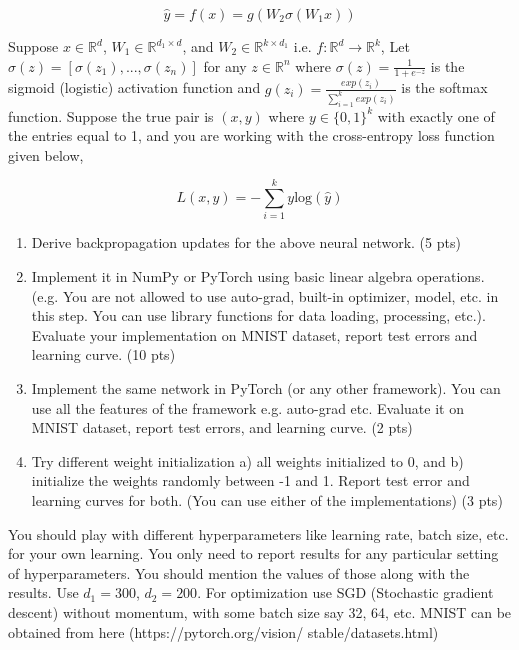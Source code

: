 \documentclass[a4paper]{article}
\theoremstyle{definition}
\begin{document}
\[
	\hat{y} = f(x) = g(W_2\sigma(W_1x))
\]

Suppose $x \in \mathbb{R}^d$, $W_1 \in \mathbb{R}^{d_1 \times d}$, and $W_2 \in \mathbb{R}^{k \times d_1}$ i.e. $f: \mathbb{R}^d \rightarrow \mathbb{R}^k$, Let $\sigma(z) = [\sigma(z_1), ..., \sigma(z_n)]$ for any $z \in \mathbb{R}^n$ where $\sigma(z) = \frac{1}{1 + e^{-z}}$ is the sigmoid (logistic) activation function and $g(z_i) = \frac{exp(z_i)}{\sum_{i=1}^k exp(z_i)}$ is the softmax function. Suppose the true pair is $(x, y)$ where $y \in \{0, 1\}^k$ with exactly one of the entries equal to 1, and you are working with the cross-entropy loss function given below,

\[
	L(x, y) = -\sum_{i=1}^k y \text{log}(\hat{y})
\]

\begin{enumerate}
	\item Derive backpropagation updates for the above neural network. (5 pts)
	\item Implement it in NumPy or PyTorch using basic linear algebra operations. (e.g. You are not allowed to use auto-grad, built-in optimizer, model, etc. in this step. You can use library functions for data loading, processing, etc.). Evaluate your implementation on MNIST dataset, report test errors and learning curve. (10 pts)
	\item Implement the same network in PyTorch (or any other framework). You can use all the features of the framework e.g. auto-grad etc. Evaluate it on MNIST dataset, report test errors, and learning curve. (2 pts)
	\item Try different weight initialization a) all weights initialized to 0, and b) initialize the weights randomly between -1 and 1. Report test error and learning curves for both. (You can use either of the implementations) (3 pts)
\end{enumerate}

You should play with different hyperparameters like learning rate, batch size, etc. for your own learning. You only need to report results for any particular setting of hyperparameters. You should mention the values of those along with the results. Use $d_1 = 300$, $d_2 = 200$. For optimization use SGD (Stochastic gradient descent) without momentum, with some batch size say 32, 64, etc. MNIST can be obtained from here (https://pytorch.org/vision/ stable/datasets.html)


\end{document}
